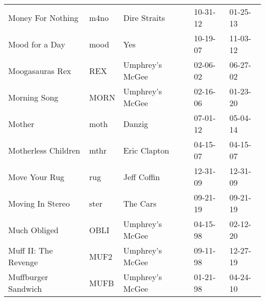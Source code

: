 \begin{longtable}{p{}p{}p{}p{}p{}}
                                                       Money For Nothing &          m4no &                                             Dire Straits &              10-31-12 &             01-25-13 \\
                                                          Mood for a Day &          mood &                                                      Yes &              10-19-07 &             11-03-12 \\
                                                         Moogasauras Rex &           REX &                                          Umphrey's McGee &              02-06-02 &             06-27-02 \\
                                                            Morning Song &          MORN &                                          Umphrey's McGee &              02-16-06 &             01-23-20 \\
                                                                  Mother &          moth &                                                   Danzig &              07-01-12 &             05-04-14 \\
                                                     Motherless Children &          mthr &                                             Eric Clapton &              04-15-07 &             04-15-07 \\
                                                           Move Your Rug &           rug &                                              Jeff Coffin &              12-31-09 &             12-31-09 \\
                                                        Moving In Stereo &          ster &                                                 The Cars &              09-21-19 &             09-21-19 \\
                                                            Much Obliged &          OBLI &                                          Umphrey's McGee &              04-15-98 &             02-12-20 \\
                                                    Muff II: The Revenge &          MUF2 &                                          Umphrey's McGee &              09-11-98 &             12-27-19 \\
                                                     Muffburger Sandwich &          MUFB &                                          Umphrey's McGee &              01-21-98 &             04-24-10 \\

\end{longtable}

